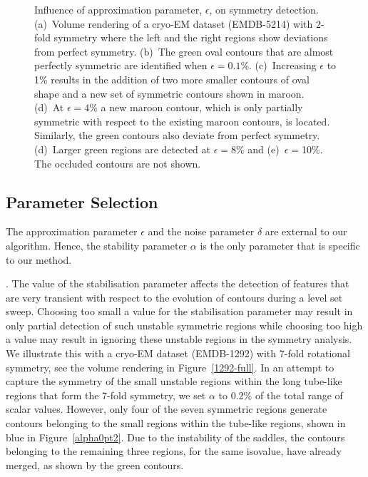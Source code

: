 \documentclass[review,journal]{vgtc}         %
\begin{document}
\begin{figure*}[t]
	\centering
	\caption{\label{eps}Influence of approximation parameter, $\epsilon$, on symmetry detection. (a)~Volume rendering of a cryo-EM dataset (EMDB-5214)
		with 2-fold symmetry where the left and the right regions show deviations from perfect symmetry.
		(b)~The green oval contours that are almost perfectly symmetric are identified when $\epsilon=0.1$\%. (c)~Increasing
		$\epsilon$ to 1\% results in the addition of two more smaller contours of oval shape and a new set of symmetric
		contours shown in maroon. (d)~At $\epsilon=4$\% a new maroon contour, which is only partially symmetric with
		respect to the existing maroon contours, is located. Similarly, the green contours also deviate from perfect symmetry. 
		(d)~Larger green regions are detected at $\epsilon=8$\% and (e)~$\epsilon=$10\%. The occluded contours are not shown.}
\end{figure*}
\subsection{Parameter Selection}\label{para}
The approximation parameter $\epsilon$ and the noise parameter $\delta$ are external to our algorithm.
Hence, the stability parameter $\alpha$ is the only parameter that is specific to our
method.

.
The value of the stabilisation parameter affects the detection of features that are very
transient with respect to the evolution of contours during a level set sweep. Choosing
too small a value for the stabilisation parameter may result in only partial detection
of such unstable symmetric regions while choosing too high a value may result in ignoring
these unstable regions in the symmetry analysis. We illustrate this with a cryo-EM dataset
(EMDB-1292) with 7-fold rotational symmetry, see the volume rendering
in Figure~\ref{1292-full}. In an attempt to capture the symmetry of the small unstable regions within
the long tube-like regions that form the 7-fold symmetry, we set $\alpha$ to 0.2\% of 
the total range of scalar values. However, only four of the seven symmetric
regions generate contours belonging to the small regions within the tube-like regions, shown
in blue in Figure~\ref{alpha0pt2}. Due to the instability of the saddles, the contours belonging to
the remaining three regions, for the same isovalue, have already merged, as shown by the green contours.
\end{document}
